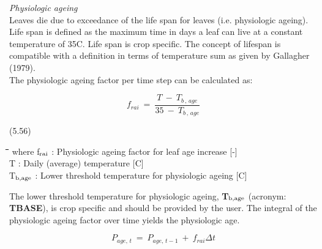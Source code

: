 {\it Physiologic ageing\/}\\
Leaves die due to exceedance of the life span for leaves (i.e. physiologic ageing). Life
span is defined as the maximum time in days a leaf can live at a constant temper\-ature of
35\degrees C. Life span is crop specific. The concept of lifespan is compatible with a definition
in terms of temperature sum as given by Gallagher (1979).\\
The physiologic ageing factor per time step can be calculat\-ed as:

\begin{displaymath}
f _{rai} ~=~{\frac{ T~-~T _{b\, ,\, age} }{35~-~ T _{b\, ,\, age} }}
\end{displaymath}

 
\strut\hfill (5.56)

\nwln
\begin{tabbing}
\hspace{1.27cm}\=\hspace{1.27cm}\=\hspace{1.27cm}\=\hspace{1.27cm}\=%
\hspace{1.27cm}\=\hspace{1.27cm}\=\hspace{1.27cm}\=\hspace{1.27cm}\=%
\hspace{1.27cm}\=\hspace{1.27cm}\=\kill
where f$_{{\rm rai}}$ : Physiologic ageing factor for leaf age increase        [-]\\
T : Daily (average) temperature        [\degrees C]\\
T$_{{\rm b,age}}$ : Lower threshold temperature for physiologic ageing        [\degrees C]
\end{tabbing}







The lower threshold temperature for physiologic ageing, {\bf T$_{{\rm b,age}}$} (acronym: {\bf TBASE}), is
crop specific and should be provided by the user. The integral of the physiologic ageing
factor over time yields the physiologic age. 

\begin{displaymath}
P _{age,\, t} ~=~ P _{age,\, t-1} ~+~f _{rai} \Delta t
\end{displaymath}


